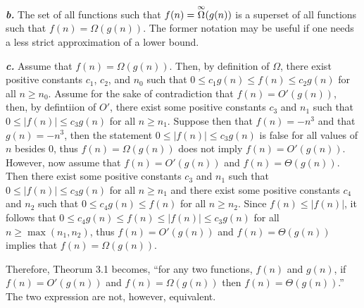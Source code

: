 \documentclass{article}
\begin{document}
\noindent\textbf{\textit{b.}} The set of all functions such that $f(n) = \overset{\small\infty}{\Omega}(g(n))$ is a superset of all functions such that $f(n) = \Omega(g(n))$. The former notation may be useful if one needs a less strict approximation of a lower bound.

\noindent\textbf{\textit{c.}} Assume that $f(n) = \Omega(g(n))$. Then, by definition of $\Omega$, there exist positive constants $c_1$, $c_2$, and $n_0$ such that $0 \leq c_1 g(n) \leq f(n) \leq c_2 g(n)$ for all $n \geq n_0$. Assume for the sake of contradiction that $f(n) = O'(g(n))$, then, by defintiion of $O'$, there exist some positive constants $c_3$ and $n_1$ such that $0 \leq | f(n) | \leq c_3 g(n)$ for all $n \geq n_1$. Suppose then that $f(n) = -n^3$ and that $g(n) = -n^3$, then the statement $0 \leq | f(n) | \leq c_3 g(n)$ is false for all values of $n$ besides $0$, thus $f(n) = \Omega(g(n))$ does not imply $f(n) = O'(g(n))$. However, now assume that $f(n) = O'(g(n))$ and $f(n) = \Theta(g(n))$. Then there exist some positive constants $c_3$ and $n_1$ such that $0 \leq | f(n) | \leq c_3 g(n)$ for all $n \geq n_1$ and there exist some positive constants $c_4$ and $n_2$ such that $0 \leq c_4 g(n) \leq f(n)$ for all $n \geq n_2$. Since $f(n) \leq | f(n) |$, it follows that $0 \leq c_4 g(n) \leq f(n) \leq | f(n) | \leq c_3 g(n)$ for all $n \geq \max(n_1, n_2)$, thus $f(n) = O'(g(n))$ and $f(n) = \Theta(g(n))$ implies that $f(n) = \Omega(g(n))$.

Therefore, Theorum 3.1 becomes, ``for any two functions, $f(n)$ and $g(n)$, if $f(n) = O'(g(n))$ and $f(n) = \Omega(g(n))$ then $f(n) = \Theta(g(n))$.'' The two expression are not, however, equivalent.
\end{document}
